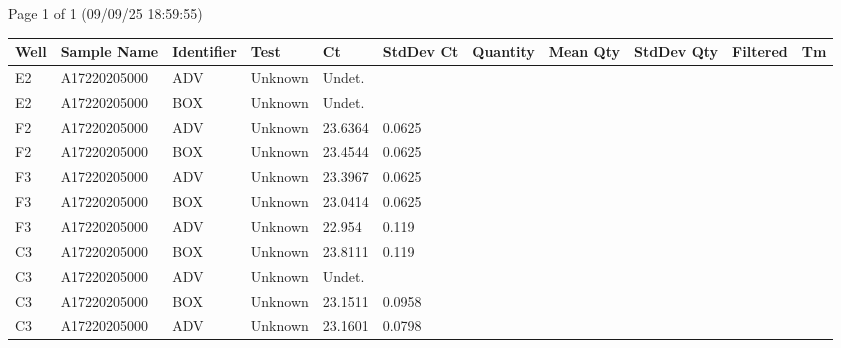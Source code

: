 \documentclass[UTF8,10pt,a4paper,fontset=fandol]{ctexart}
\begin{document}
\noindent
\hfill Page 1 of 1 (09/09/25 18:59:55)

\newpage

\begin{center}
\small
\begin{tabular}{|l|l|l|l|l|l|l|l|l|l|l|}
\hline
\textbf{Well} & \textbf{Sample Name} & \textbf{Identifier} & \textbf{Test} &
\textbf{Ct} & \textbf{StdDev Ct} & \textbf{Quantity} & \textbf{Mean Qty} &
\textbf{StdDev Qty} & \textbf{Filtered} & \textbf{Tm} \\
\hline
E2 & A17220205000 & ADV & Unknown & Undet. &  &  &  &  &  &  \\
E2 & A17220205000 & BOX & Unknown & Undet. &  &  &  &  &  &  \\
F2 & A17220205000 & ADV & Unknown & 23.6364 & 0.0625 &  &  &  &  &  \\
F2 & A17220205000 & BOX & Unknown & 23.4544 & 0.0625 &  &  &  &  &  \\
F3 & A17220205000 & ADV & Unknown & 23.3967 & 0.0625 &  &  &  &  &  \\
F3 & A17220205000 & BOX & Unknown & 23.0414 & 0.0625 &  &  &  &  &  \\
F3 & A17220205000 & ADV & Unknown & 22.954 & 0.119 &  &  &  &  &  \\
C3 & A17220205000 & BOX & Unknown & 23.8111 & 0.119 &  &  &  &  &  \\
C3 & A17220205000 & ADV & Unknown & Undet. &  &  &  &  &  &  \\
C3 & A17220205000 & BOX & Unknown & 23.1511 & 0.0958 &  &  &  &  &  \\
C3 & A17220205000 & ADV & Unknown & 23.1601 & 0.0798 &  &  &  &  &  \\
\hline
\end{tabular}
\end{center}


\newpage
\end{document}
